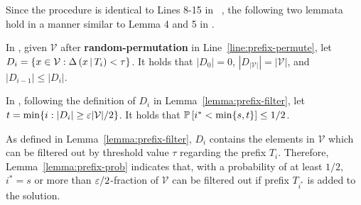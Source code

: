 \begin{algorithm}[ht]
\caption{Select a prefix of $\mathcal V$ \st its average marginal gain is greater than $(1-\epsi)\tau$, and with a probability of $1/2$, more than an $\epsi/2$-fraction of $\mathcal V$ has a marginal gain less than $\tau$ relative to the prefix.}
\label{alg:prefix}
\end{algorithm}
Since the procedure \prefix is identical to Lines 8-15 in \ts~\citep{Chen2024},
the following two lemmata hold in a manner similar to Lemma 4 and 5 in \citet{Chen2024}.
\begin{lemma}\label{lemma:prefix-filter}
In \prefix, given $\mathcal V$ after \textbf{random-permutation} in Line~\ref{line:prefix-permute},
let $D_i = \left\{x\in \mathcal V: \Delta \left( x \, \middle| \, T_i \right) < \tau\right\}$.
It holds that $|D_0|=0$, $|D_{|\mathcal V|}| = |\mathcal V|$, and $|D_{i-1}|\le |D_i|$.
\end{lemma}
\begin{lemma}\label{lemma:prefix-prob}
In \prefix, following the definition of $D_i$ in Lemma~\ref{lemma:prefix-filter},
let $t = \min\{i: |D_i| \ge \varepsilon |\mathcal V|/2\}$.
It holds that $\mathbb{P} \left[ i^* < \min\{s,t\} \right] \le 1/2$.
\end{lemma}
As defined in Lemma~\ref{lemma:prefix-filter},
$D_i$ contains the elements in $\mathcal V$
which can be filtered out by threshold value $\tau$
regarding the prefix $T_i$.
Therefore, Lemma~\ref{lemma:prefix-prob} indicates that,
with a probability of at least $1/2$,
$i^* = s$ or
more than $\epsi/2$-fraction of $\mathcal V$
can be filtered out if prefix $T_{i^*}$ is added to the solution.

\begin{algorithm}[ht]
\caption{Update candidate set $V$ with threshold value $\tau$}
\label{alg:update}
\end{algorithm}
